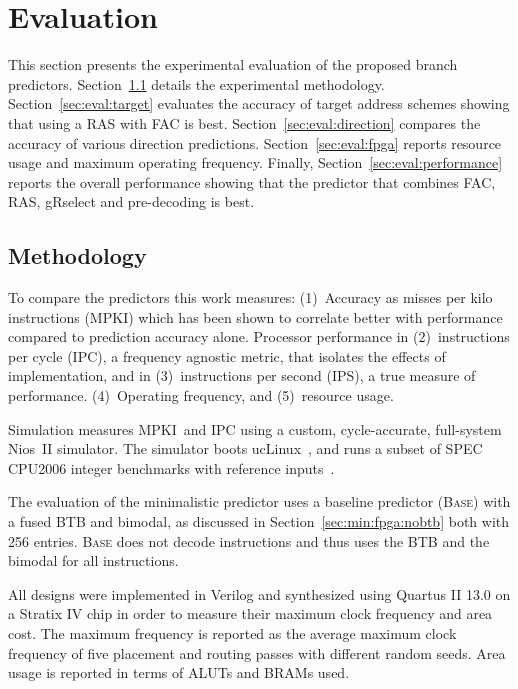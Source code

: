 \chapter{Evaluation}
\label{chap:eval}

This section presents the experimental evaluation of the proposed branch predictors.
Section~\ref{sec:eval:methodology} details the experimental methodology. Section~\ref{sec:eval:target} evaluates the accuracy of  target address schemes showing that using a RAS with FAC is best. Section~\ref{sec:eval:direction} compares the accuracy of various direction predictions. Section~\ref{sec:eval:fpga} reports resource usage and maximum operating frequency. Finally,  Section~\ref{sec:eval:performance} reports the overall performance showing that the predictor that combines FAC, RAS, gRselect and pre-decoding is best. 


\section{Methodology}
\label{sec:eval:methodology}

To compare the predictors this work measures: (1)~Accuracy as misses per kilo instructions (MPKI) which has been shown to correlate better with performance compared to prediction accuracy alone. Processor performance in (2)~instructions per cycle (IPC), a frequency agnostic metric, that isolates the effects of implementation, and  in (3)~instructions per second (IPS), a true measure of performance. (4)~Operating frequency, and (5)~resource usage.

Simulation measures MPKI\ and IPC using a custom, cycle-accurate, full-system Nios~II simulator. The simulator boots ucLinux~\cite{uclinux}, and runs a subset of SPEC CPU2006 integer benchmarks with reference inputs~\cite{spec2k6}.

The evaluation of the minimalistic predictor uses a baseline predictor (\textsc{Base}) with a fused BTB and bimodal, as discussed in Section~\ref{sec:min:fpga:nobtb} both with 256 entries. \textsc{Base} does not decode instructions and thus uses the BTB and the bimodal for all instructions. 

All designs were implemented in Verilog and synthesized using Quartus II 13.0 on a Stratix IV chip in order to measure their maximum clock frequency and area cost. The maximum frequency is reported as the average maximum clock frequency of five placement and routing passes with different random seeds. Area usage is reported in terms of ALUTs and BRAMs used.


